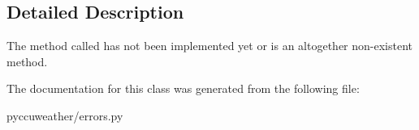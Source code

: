 \subsection{Detailed Description}
\begin{DoxyVerb}The method called has not been implemented yet or is an altogether non-existent method.
\end{DoxyVerb}
 

The documentation for this class was generated from the following file\+:\begin{DoxyCompactItemize}
\item 
pyccuweather/errors.\+py\end{DoxyCompactItemize}

